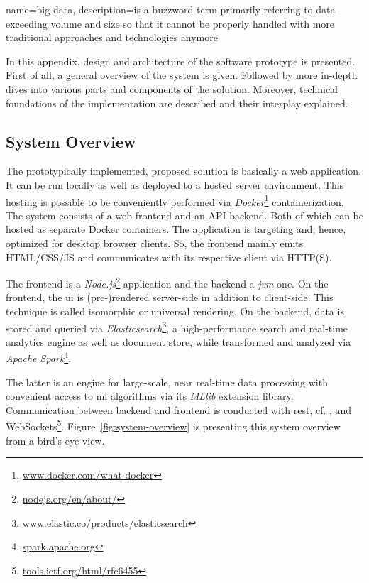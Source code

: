 {
  name={big data},
  description={is a buzzword term primarily referring to data exceeding volume and size so that it cannot be properly handled with more traditional approaches and technologies anymore}
}


In this appendix, design and architecture of the software prototype is presented.
First of all, a general overview of the system is given.
Followed by more in-depth dives into various parts and components of the solution.
Moreover, technical foundations of the implementation are described and their interplay explained.


\subsection{System Overview}

The prototypically implemented, proposed solution is basically a web application.
It can be run locally as well as deployed to a hosted server environment.
This hosting is possible to be conveniently performed via \emph{Docker}\footnote{\textcolor{blue}{\href{https://www.docker.com/what-docker}{www.docker.com/what-docker}}} containerization.
The system consists of a web frontend and an \textsc{API} backend.
Both of which can be hosted as separate Docker containers.
The application is targeting and, hence, optimized for desktop browser clients.
So, the frontend mainly emits \textsc{HTML}/\textsc{CSS}/\textsc{JS} and communicates with its respective client via \textsc{HTTP(S)}.

The frontend is a \emph{Node.js}\footnote{\textcolor{blue}{\href{https://nodejs.org/en/about/}{nodejs.org/en/about/}}} application and the backend a \emph{\gls{jvm}} one.
On the frontend, the \gls{ui} is (pre-)rendered server-side in addition to client-side.
This technique is called isomorphic or universal rendering.
On the backend, data is stored and queried via \emph{Elasticsearch}\footnote{\textcolor{blue}{\href{https://www.elastic.co/products/elasticsearch}{www.elastic.co/products/elasticsearch}}}, a high-performance search and real-time analytics engine as well as document store, while transformed and analyzed via \emph{Apache Spark}\footnote{\textcolor{blue}{\href{https://spark.apache.org/}{spark.apache.org}}}.

The latter is an engine for large-scale, near real-time data processing with convenient access to \gls{ml} algorithms via its \emph{MLlib} extension library.
Communication between backend and frontend is conducted with \gls{rest}, cf. \cite{Fielding2000}, and WebSockets\footnote{\textcolor{blue}{\href{https://tools.ietf.org/html/rfc6455}{tools.ietf.org/html/rfc6455}}}.
Figure~\ref{fig:system-overview} is presenting this system overview from a bird's eye view.


